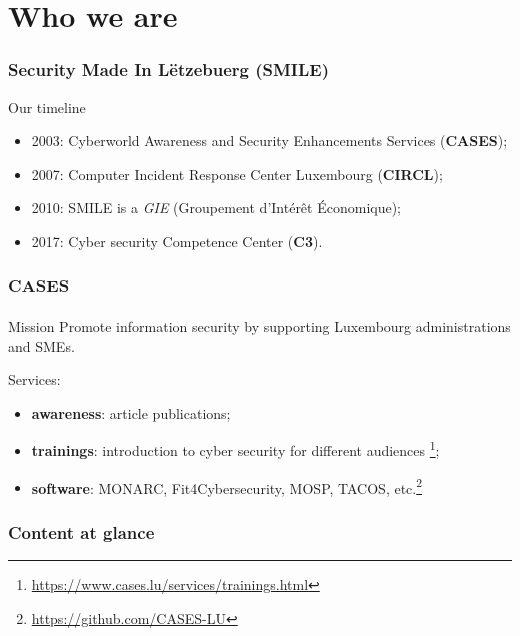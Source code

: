 %
%
\section*{Who we are}
\begin{frame}
    \frametitle{Security Made In Lëtzebuerg (SMILE)}
    Our timeline
    \begin{center}
        \begin{itemize}
            \item 2003: Cyberworld Awareness and Security Enhancements Services (\textbf{CASES});
            \item 2007: Computer Incident Response Center Luxembourg (\textbf{CIRCL});
            \item 2010: SMILE is a \textit{GIE} (Groupement d’Intérêt Économique);
            \item 2017: Cyber security Competence Center (\textbf{C3}).
        \end{itemize}
    \end{center}
\end{frame}

\begin{frame}
    \frametitle{CASES}
    \framesubtitle{}
    \begin{block}{Mission}
        Promote information security by supporting Luxembourg administrations and SMEs.
    \end{block}
    \bigskip
    Services:
    \begin{center}
        \begin{itemize}
            \item \textbf{awareness}: article publications;
            \item \textbf{trainings}:
                introduction to cyber security for different audiences \footnote{\url{https://www.cases.lu/services/trainings.html}};
            \item \textbf{software}:
                MONARC, Fit4Cybersecurity, MOSP, TACOS, etc.\footnote{\url{https://github.com/CASES-LU}}
        \end{itemize}
    \end{center}
\end{frame}

\setcounter{tocdepth}{1}
\begin{frame}
    \frametitle{Content at glance}
    \tableofcontents
\end{frame}
\setcounter{tocdepth}{4}

